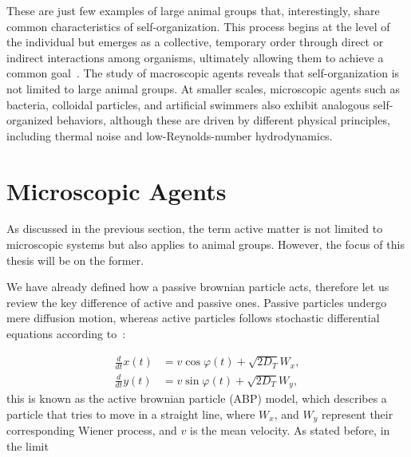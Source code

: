 These are just few examples of large animal groups that, interestingly, share common characteristics of self-organization. This process begins at the level of the individual but emerges as a collective, temporary order through direct or indirect interactions among organisms, ultimately allowing them to achieve a common goal~\cite{isaeva2012self}.
The study of macroscopic agents reveals that self-organization is not limited to large animal groups. At smaller scales, microscopic agents such as bacteria, colloidal particles, and artificial swimmers also exhibit analogous self-organized behaviors, although these are driven by different physical principles, including thermal noise and low-Reynolds-number hydrodynamics.

\section{Microscopic Agents}

As discussed in the previous section, the term active matter is not limited to microscopic systems but also applies to animal groups. However, the focus of this thesis will be on the former.

We have already defined how a passive brownian particle acts, therefore let us review the key difference of active and passive ones. Passive particles undergo mere diffusion motion, whereas active particles follows stochastic differential equations according to~\cite{volpe2014simulation}: 

\begin{align}
  \frac{d}{dt}x(t) &= v\cos{\varphi(t)} + \sqrt{2D_T}W_x,\\
  \frac{d}{dt}y(t) &= v\sin{\varphi(t)} + \sqrt{2D_T}W_y,
  \label{eq:activestochasticequation}
\end{align}
this is known as the active brownian particle (ABP) model, which describes a particle that tries to move in a straight line, where $W_x$, and $W_y$ represent their corresponding Wiener process, and $v$ is the mean velocity. As stated before, in the limit 

